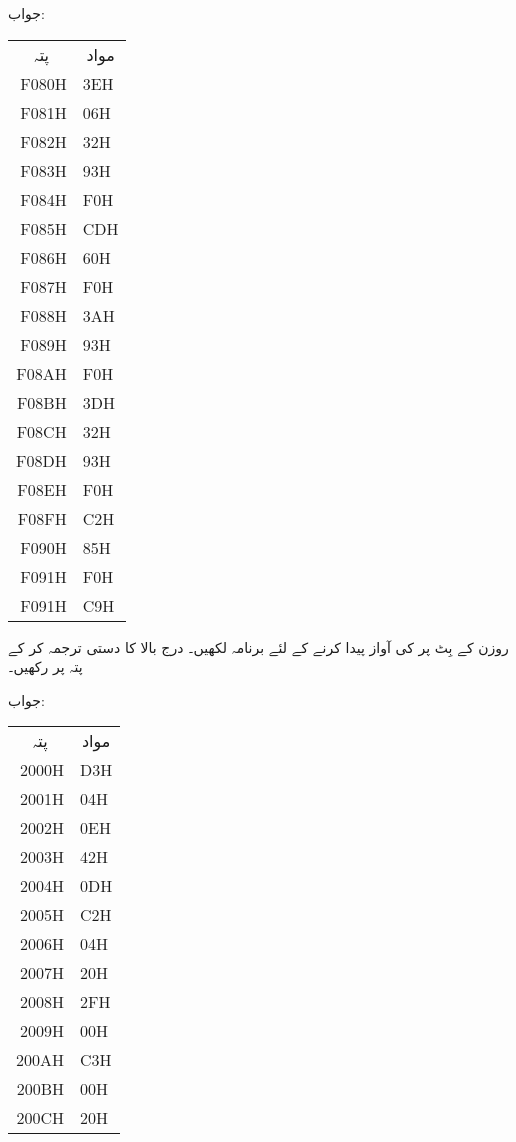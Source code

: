 جواب:
\begin{center}
\begin{tabular}{rl}
\multicolumn{1}{c}{پتہ}&\multicolumn{1}{c}{مواد}\\[1ex]
F080H&3EH\\
F081H&06H\\
F082H&32H\\
F083H&93H\\
F084H&F0H\\
F085H&CDH\\
F086H&60H\\
F087H&F0H\\
F088H&3AH\\
F089H&93H\\
F08AH&F0H\\
F08BH&3DH\\
F08CH&32H\\
F08DH&93H\\
F08EH&F0H\\
F08FH&C2H\\
F090H&85H\\
F091H&F0H\\
F091H&C9H
\end{tabular}
\end{center}
روزن  کے بِٹ  پر   کی آواز پیدا کرنے کے لئے برنامہ لکھیں۔
درج بالا کا دستی ترجمہ کر کے پتہ  پر رکھیں۔

جواب:
\begin{center}
\begin{tabular}{rl}
\multicolumn{1}{c}{پتہ}&\multicolumn{1}{c}{مواد}\\[1ex]
2000H&D3H\\
2001H&04H\\
2002H&0EH\\
2003H&42H\\
2004H&0DH\\
2005H&C2H\\
2006H&04H\\
2007H&20H\\
2008H&2FH\\
2009H&00H\\
200AH&C3H\\
200BH&00H\\
200CH&20H
\end{tabular}
\end{center}
